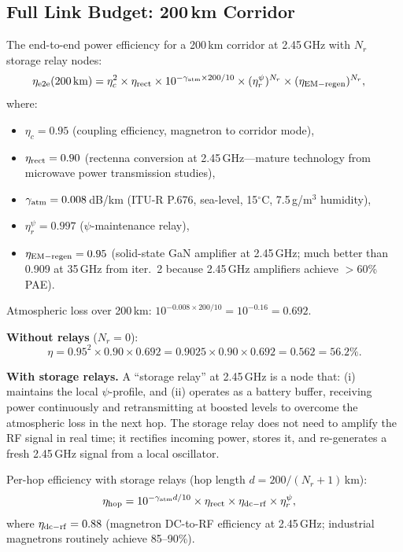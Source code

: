 \documentclass[aps,prd,twocolumn,superscriptaddress]{revtex4-2}
\begin{document}
\subsection{Full Link Budget: 200\,km Corridor}

The end-to-end power efficiency for a 200\,km corridor at 2.45\,GHz
with $N_r$ storage relay nodes:
\begin{align}
\eta_{\rm e2e}(200\,\text{km}) &= \eta_c^2\times\eta_{\rm rect}
\times 10^{-\gamma_{\rm atm}\times200/10}
\times (\eta_r^\psi)^{N_r} \times (\eta_{\rm EM-regen})^{N_r},
\label{eq:link-budget-200}
\end{align}
where:
\begin{itemize}
\item $\eta_c = 0.95$ (coupling efficiency, magnetron to corridor mode),
\item $\eta_{\rm rect} = 0.90$ (rectenna conversion at 2.45\,GHz---mature
technology from microwave power transmission studies),
\item $\gamma_{\rm atm} = 0.008$\,dB/km (ITU-R P.676, sea-level, 15$^\circ$C,
7.5\,g/m$^3$ humidity),
\item $\eta_r^\psi = 0.997$ ($\psi$-maintenance relay),
\item $\eta_{\rm EM-regen} = 0.95$ (solid-state GaN amplifier at 2.45\,GHz;
much better than 0.909 at 35\,GHz from iter.~2 because 2.45\,GHz
amplifiers achieve $>$60\% PAE).
\end{itemize}

Atmospheric loss over 200\,km: $10^{-0.008\times200/10} = 10^{-0.16}
= 0.692$.

\textbf{Without relays} ($N_r = 0$):
\begin{equation}
\eta = 0.95^2\times0.90\times0.692 = 0.9025\times0.90\times0.692
= 0.562 = 56.2\%.
\end{equation}

\textbf{With storage relays.}
A ``storage relay'' at 2.45\,GHz is a node that: (i) maintains the
local $\psi$-profile, and (ii) operates as a battery buffer, receiving
power continuously and retransmitting at boosted levels to overcome the
atmospheric loss in the next hop.  The storage relay does not need to
amplify the RF signal in real time; it rectifies incoming power, stores
it, and re-generates a fresh 2.45\,GHz signal from a local oscillator.

Per-hop efficiency with storage relays (hop length $d = 200/(N_r+1)$\,km):
\begin{align}
\eta_{\rm hop} &= 10^{-\gamma_{\rm atm} d/10}\times\eta_{\rm rect}
\times\eta_{\rm dc-rf}\times\eta_r^\psi,
\end{align}
where $\eta_{\rm dc-rf} = 0.88$ (magnetron DC-to-RF efficiency at
2.45\,GHz; industrial magnetrons routinely achieve 85--90\%).
\end{document}
